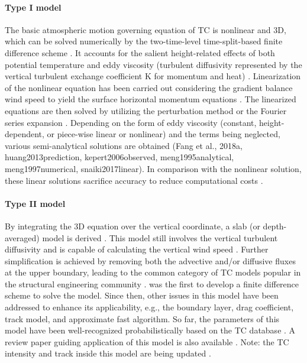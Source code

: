 \paragraph{Type I model} The basic atmospheric motion governing equation of TC is nonlinear and 3D, which can be solved numerically by the two-time-level time-split-based finite difference scheme \citep{kepert2001dynamics-ii,kepert2011choosing}. It accounts for the salient height-related effects of both potential temperature and eddy viscosity (turbulent diffusivity represented by the vertical turbulent exchange coefficient K for momentum and heat) \citep{kepert2001dynamics-ii, kepert2010slab-ii}. Linearization of the nonlinear equation has been carried out considering the gradient balance wind speed to yield the surface horizontal momentum equations \citep{kepert2001dynamics-i}. The linearized equations are then solved by utilizing the perturbation method \citep{meng1995analytical} or the Fourier series expansion \citep{kepert2001dynamics-i}. Depending on the form of eddy viscosity (constant, height-dependent, or piece-wise linear or nonlinear) and the terms being neglected, various semi-analytical solutions are obtained (Fang et al., 2018a, huang2013prediction, kepert2006observed, meng1995analytical, meng1997numerical, snaiki2017linear). In comparison with the nonlinear solution, these linear solutions sacrifice accuracy to reduce computational costs \citep{kepert2014reply}. 

\paragraph{Type II model} By integrating the 3D equation over the vertical coordinate, a slab (or depth-averaged) model is derived \citep{kepert2010slab-i}. This model still involves the vertical turbulent diffusivity and is capable of calculating the vertical wind speed \citep{langousis2008extreme, smith1968surface, smith2008simple}. Further simplification is achieved by removing both the advective and/or diffusive fluxes at the upper boundary, leading to the common category of TC models popular in the structural engineering community \citep{powell2005state, shapiro1983asymmetric, vickery2000hurricane, vickery2009hurricane-b}. \cite{chow1971study} was the first to develop a finite difference scheme to solve the model. Since then, other issues in this model have been addressed to enhance its applicability, e.g., the boundary layer, drag coefficient, track model, and approximate fast algorithm. So far, the parameters of this model have been well-recognized probabilistically based on the TC database \citep{vickery2008statistical}. A review paper guiding application of this model is also available \citep{vickery2009hurricane-a}. Note: the TC intensity and track inside this model are being updated \citep{mudd2015development, vickery2010synthetic}. 

